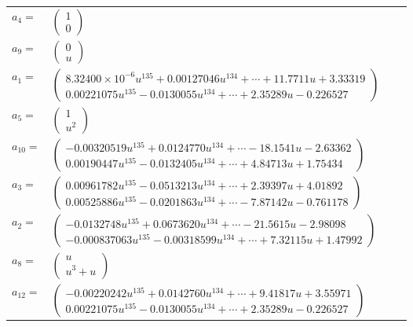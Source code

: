 \documentclass[1p]{elsarticle_modified}
\theoremstyle{definition}
\begin{document}
\begin{tabular}{m{7pt} m{180pt} m{7pt} m{180pt} }
\flushright $a_{4}=$&$\begin{pmatrix}1\\0\end{pmatrix}$ \\
\flushright $a_{9}=$&$\begin{pmatrix}0\\u\end{pmatrix}$ \\
\flushright $a_{1}=$&$\begin{pmatrix}8.32400\times10^{-6} u^{135}+0.00127046 u^{134}+\cdots+11.7711 u+3.33319\\0.00221075 u^{135}-0.0130055 u^{134}+\cdots+2.35289 u-0.226527\end{pmatrix}$ \\
\flushright $a_{5}=$&$\begin{pmatrix}1\\u^2\end{pmatrix}$ \\
\flushright $a_{10}=$&$\begin{pmatrix}-0.00320519 u^{135}+0.0124770 u^{134}+\cdots-18.1541 u-2.63362\\0.00190447 u^{135}-0.0132405 u^{134}+\cdots+4.84713 u+1.75434\end{pmatrix}$ \\
\flushright $a_{3}=$&$\begin{pmatrix}0.00961782 u^{135}-0.0513213 u^{134}+\cdots+2.39397 u+4.01892\\0.00525886 u^{135}-0.0201863 u^{134}+\cdots-7.87142 u-0.761178\end{pmatrix}$ \\
\flushright $a_{2}=$&$\begin{pmatrix}-0.0132748 u^{135}+0.0673620 u^{134}+\cdots-21.5615 u-2.98098\\-0.000837063 u^{135}-0.00318599 u^{134}+\cdots+7.32115 u+1.47992\end{pmatrix}$ \\
\flushright $a_{8}=$&$\begin{pmatrix}u\\u^3+u\end{pmatrix}$ \\
\flushright $a_{12}=$&$\begin{pmatrix}-0.00220242 u^{135}+0.0142760 u^{134}+\cdots+9.41817 u+3.55971\\0.00221075 u^{135}-0.0130055 u^{134}+\cdots+2.35289 u-0.226527\end{pmatrix}$ \\

\end{tabular}
\end{document}
